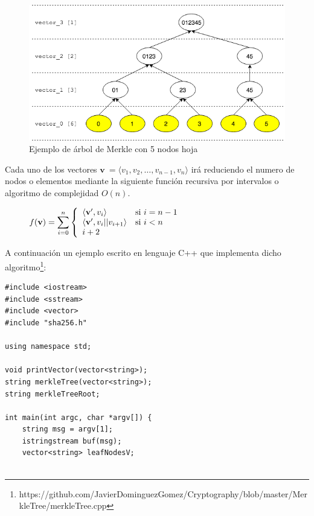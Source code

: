 \documentclass{article}
\begin{document}
\begin{enumerate}
        \begin{figure}[H]
        \centering
            \includegraphics[scale=0.53]{img/Merkle_tree_05_leaves_nodes}
            \caption{Ejemplo de árbol de Merkle con 5 nodos hoja}
        \end{figure}
        
        Cada uno de los vectores $\mathbf{v} \ = \langle v_{1}, v_{2}, \dots, v_{n - 1}, v_{n} \rangle$ irá reduciendo el numero de nodos o elementos mediante la siguiente función recursiva por intervalos o algoritmo de complejidad $O(n)$.
        
        \begin{figure}[H]
        \centering
            $f(\mathbf{v}) = \mathlarger{\sum}_{i=0}^{n} \left \{
            \begin{array}{ll}
                \langle \mathbf{v}^{\prime}, v_{i}\rangle & \mbox{si } i=n-1 \\
                \langle \mathbf{v}^{\prime}, v_{i}||v_{i+1} \rangle & \mbox{si } i < n \\
                i+2
            \end{array}
            \right .$
        \end{figure}
        A continuación un ejemplo escrito en lenguaje C++ que implementa dicho algoritmo\footnote{https://github.com/JavierDominguezGomez/Cryptography/blob/master/MerkleTree/merkleTree.cpp}:
        
        \begin{verbatim}
#include <iostream>
#include <sstream>
#include <vector>
#include "sha256.h"
 
using namespace std;
 
void printVector(vector<string>);
string merkleTree(vector<string>);
string merkleTreeRoot;
 
int main(int argc, char *argv[]) {
    string msg = argv[1];
    istringstream buf(msg);
    vector<string> leafNodesV;
    

\end{verbatim}
\end{enumerate}
\end{document}
